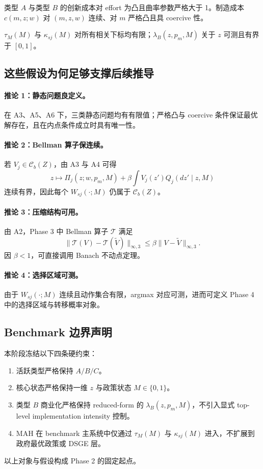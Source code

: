 \begin{assumption}[A5: 静态技术凸性]
类型 $A$ 与类型 $B$ 的创新成本对 effort 为凸且曲率参数严格大于 1。制造成本 $c(m,z;w)$ 对 $(m,z,w)$ 连续、对 $m$ 严格凸且具 coercive 性。
\end{assumption}

\begin{assumption}
$\tau_M(M)$ 与 $\kappa_{sj}(M)$ 对所有相关下标均有限；$\lambda_B(z,p_m,M)$ 关于 $z$ 可测且有界于 $[0,1]$。
\end{assumption}

\subsection{这些假设为何足够支撑后续推导}

\paragraph{推论 1：静态问题良定义。}
在 A3、A5、A6 下，三类静态问题均有有限值；严格凸与 coercive 条件保证最优解存在，且在内点条件成立时具有唯一性。

\paragraph{推论 2：Bellman 算子保连续。}
若 $V_j\in\mathcal C_b(Z)$，由 A3 与 A4 可得
\[
z\mapsto \Pi_j(z;w,p_m,M)+\beta\int V_j(z')Q_j(dz'\mid z,M)
\]
连续有界，因此每个 $W_{sj}(\cdot;M)$ 仍属于 $\mathcal C_b(Z)$。

\paragraph{推论 3：压缩结构可用。}
由 A2，Phase 3 中 Bellman 算子 $\mathcal T$ 满足
\[
\|\mathcal T(V)-\mathcal T(\tilde V)\|_{\infty,3}
\le
\beta\|V-\tilde V\|_{\infty,3}.
\]
因 $\beta<1$，可直接调用 Banach 不动点定理。

\paragraph{推论 4：选择区域可测。}
由于 $W_{sj}(\cdot;M)$ 连续且动作集合有限，argmax 对应可测，进而可定义 Phase 4 中的选择区域与转移概率对象。

\subsection{Benchmark 边界声明}

本阶段冻结以下四条硬约束：
\begin{enumerate}
    \item 活跃类型严格保持 $A/B/C$。
    \item 核心状态严格保持一维 $z$ 与政策状态 $M\in\{0,1\}$。
    \item 类型 $B$ 商业化严格保持 reduced-form 的 $\lambda_B(z,p_m,M)$，不引入显式 top-level implementation intensity 控制。
    \item MAH 在 benchmark 主系统中仅通过 $\tau_M(M)$ 与 $\kappa_{sj}(M)$ 进入，不扩展到政府最优政策或 DSGE 层。
\end{enumerate}

以上对象与假设构成 Phase 2 的固定起点。
